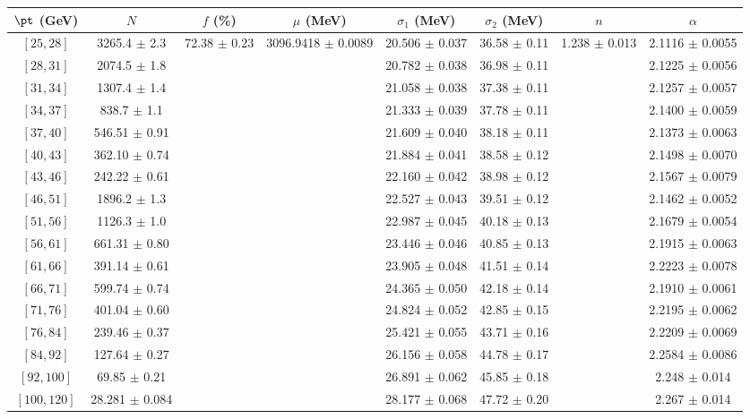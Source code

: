 \begin{tabular}{c||c|c|c|c|c|c|c}
$\pt$ (GeV) & $N$ & $f$ (\%) & $\mu$ (MeV) & $\sigma_1$ (MeV) & $\sigma_2$ (MeV) & $n$ & $\alpha$ \\
\hline
$[25, 28]$ & 3265.4 $\pm$ 2.3 & \multirow{17}{*}{72.38 $\pm$ 0.23} & \multirow{17}{*}{3096.9418 $\pm$ 0.0089} & 20.506 $\pm$ 0.037 & 36.58 $\pm$ 0.11 & \multirow{17}{*}{1.238 $\pm$ 0.013} & 2.1116 $\pm$ 0.0055\\
$[28, 31]$ & 2074.5 $\pm$ 1.8 &  &  & 20.782 $\pm$ 0.038 & 36.98 $\pm$ 0.11 &  & 2.1225 $\pm$ 0.0056\\
$[31, 34]$ & 1307.4 $\pm$ 1.4 &  &  & 21.058 $\pm$ 0.038 & 37.38 $\pm$ 0.11 &  & 2.1257 $\pm$ 0.0057\\
$[34, 37]$ & 838.7 $\pm$ 1.1 &  &  & 21.333 $\pm$ 0.039 & 37.78 $\pm$ 0.11 &  & 2.1400 $\pm$ 0.0059\\
$[37, 40]$ & 546.51 $\pm$ 0.91 &  &  & 21.609 $\pm$ 0.040 & 38.18 $\pm$ 0.11 &  & 2.1373 $\pm$ 0.0063\\
$[40, 43]$ & 362.10 $\pm$ 0.74 &  &  & 21.884 $\pm$ 0.041 & 38.58 $\pm$ 0.12 &  & 2.1498 $\pm$ 0.0070\\
$[43, 46]$ & 242.22 $\pm$ 0.61 &  &  & 22.160 $\pm$ 0.042 & 38.98 $\pm$ 0.12 &  & 2.1567 $\pm$ 0.0079\\
$[46, 51]$ & 1896.2 $\pm$ 1.3 &  &  & 22.527 $\pm$ 0.043 & 39.51 $\pm$ 0.12 &  & 2.1462 $\pm$ 0.0052\\
$[51, 56]$ & 1126.3 $\pm$ 1.0 &  &  & 22.987 $\pm$ 0.045 & 40.18 $\pm$ 0.13 &  & 2.1679 $\pm$ 0.0054\\
$[56, 61]$ & 661.31 $\pm$ 0.80 &  &  & 23.446 $\pm$ 0.046 & 40.85 $\pm$ 0.13 &  & 2.1915 $\pm$ 0.0063\\
$[61, 66]$ & 391.14 $\pm$ 0.61 &  &  & 23.905 $\pm$ 0.048 & 41.51 $\pm$ 0.14 &  & 2.2223 $\pm$ 0.0078\\
$[66, 71]$ & 599.74 $\pm$ 0.74 &  &  & 24.365 $\pm$ 0.050 & 42.18 $\pm$ 0.14 &  & 2.1910 $\pm$ 0.0061\\
$[71, 76]$ & 401.04 $\pm$ 0.60 &  &  & 24.824 $\pm$ 0.052 & 42.85 $\pm$ 0.15 &  & 2.2195 $\pm$ 0.0062\\
$[76, 84]$ & 239.46 $\pm$ 0.37 &  &  & 25.421 $\pm$ 0.055 & 43.71 $\pm$ 0.16 &  & 2.2209 $\pm$ 0.0069\\
$[84, 92]$ & 127.64 $\pm$ 0.27 &  &  & 26.156 $\pm$ 0.058 & 44.78 $\pm$ 0.17 &  & 2.2584 $\pm$ 0.0086\\
$[92, 100]$ & 69.85 $\pm$ 0.21 &  &  & 26.891 $\pm$ 0.062 & 45.85 $\pm$ 0.18 &  & 2.248 $\pm$ 0.014\\
$[100, 120]$ & 28.281 $\pm$ 0.084 &  &  & 28.177 $\pm$ 0.068 & 47.72 $\pm$ 0.20 &  & 2.267 $\pm$ 0.014\\
\end{tabular}
